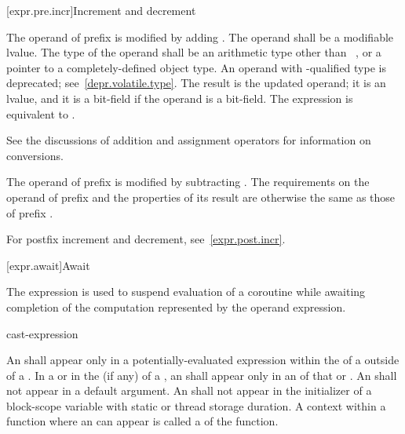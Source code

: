 [expr.pre.incr]{Increment and decrement}

\pnum
{}%
%
The operand of prefix \tcode{++}
%
%
is modified by adding .
%
The operand shall be a modifiable lvalue. The type of the operand shall
be an arithmetic type other than \cv{}~,
or a pointer to a completely-defined object type.
An operand with -qualified type is deprecated;
see~\ref{depr.volatile.type}.
The result is the updated operand; it is an lvalue, and it is a
bit-field if the operand is a bit-field.
The expression  is equivalent to .
%
\begin{note}
See the discussions of addition and assignment
operators for information on conversions.
\end{note}

\pnum
The operand of prefix
%
\tcode{\dcr} is modified by subtracting .
The requirements on the operand of prefix
\tcode{\dcr} and the properties of its result are otherwise the same as
those of prefix \tcode{++}.
\begin{note}
For postfix increment and decrement, see~\ref{expr.post.incr}.
\end{note}

[expr.await]{Await}
%
%

\pnum
The  expression is used to suspend evaluation of a
coroutine while awaiting completion of
the computation represented by the operand expression.

\begin{bnf}
\br
     cast-expression
\end{bnf}

\pnum
An  shall appear only in a potentially-evaluated
expression within the  of a
 outside of a .
In a  or in the
 (if any)
of a , an 
shall appear only in an  of that
 or .
An  shall not appear in a
default argument.
An  shall not appear in the initializer of
a block-scope variable with static or thread storage duration.
A context within a function where an  can appear
is called a  of the function.

